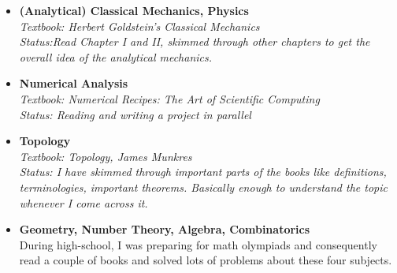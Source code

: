 \documentclass[12pt]{article}
\begin{document}
\begin{itemize}
        \\
        \textit{Textbook: Stephen Abbot's Understand Analysis}
        \\
        \textit{Status: Have Studied all the chapters except for Integrals and Series chapters}
    \item[] \textbf{(Analytical) Classical Mechanics, Physics}
        \\
        \textit{Textbook: Herbert Goldstein's Classical Mechanics}
        \\
        \textit{Status:Read Chapter I and II, skimmed through other chapters to get the overall idea of the analytical mechanics.
}
    \item[] \textbf{Numerical Analysis}
        \\
        \textit{Textbook: Numerical Recipes: The Art of Scientific Computing}
        \\
        \textit{Status: Reading and writing a project in parallel }
    \item[] \textbf{Topology}
        \\
        \textit{Textbook: Topology, James Munkres}
        \\
        \textit{Status: I have skimmed through important parts of the books like definitions, terminologies, important theorems. Basically enough to understand the topic whenever I come across it.}
    \item[] \textbf{Geometry, Number Theory, Algebra, Combinatorics}
        \\ 
        During high-school, I was preparing for math olympiads and consequently read a couple of books and solved lots of problems about these four subjects.
\end{itemize}
\end{document}
